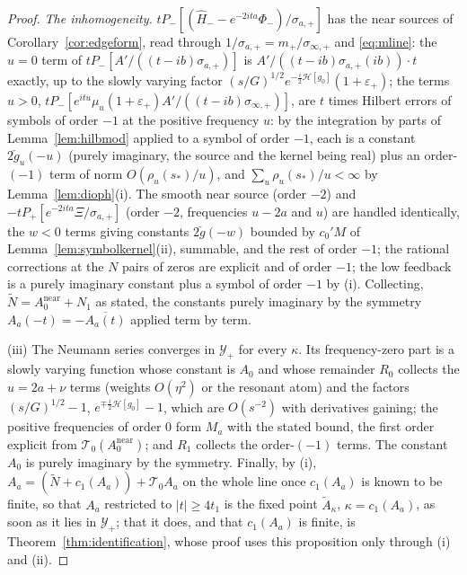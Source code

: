 \documentclass[11pt]{article}
\theoremstyle{definition}
\theoremstyle{remark}
\begin{document}
\begin{proof}
\emph{The inhomogeneity.} $tP_-[(\hat H_--e^{-2ita}\Phi_-)/\sigma_{a,+}]$ has the near sources of Corollary~\ref{cor:edgeform}, read through $1/\sigma_{a,+}=m_+/\sigma_{\infty,+}$ and \eqref{eq:mline}: the $u=0$ term of $tP_-[A'/((t-ib)\sigma_{a,+})]$ is $A'/((t-ib)\sigma_{a,+}(ib))\cdot t$ exactly, up to the slowly varying factor $(s/G)^{1/2}e^{-\frac i2\mathcal H[g_0]}(1+\varepsilon_+)$; the terms $u>0$, $tP_-[e^{itu}\mu_u(1+\varepsilon_+)A'/((t-ib)\sigma_{\infty,+})]$, are $t$ times Hilbert errors of symbols of order $-1$ at the positive frequency $u$: by the integration by parts of Lemma~\ref{lem:hilbmod} applied to a symbol of order $-1$, each is a constant $2\check g_u(-u)$ (purely imaginary, the source and the kernel being real) plus an order-$(-1)$ term of norm $O(\rho_u(s_*)/u)$, and $\sum_u\rho_u(s_*)/u<\infty$ by Lemma~\ref{lem:dioph}(i). The smooth near source (order $-2$) and $-tP_+[e^{-2ita}\Xi/\sigma_{a,+}]$ (order $-2$, frequencies $u-2a$ and $u$) are handled identically, the $w<0$ terms giving constants $2\check g(-w)$ bounded by $c_0'M$ of Lemma~\ref{lem:symbolkernel}(ii), summable, and the rest of order $-1$; the rational corrections at the $N$ pairs of zeros are explicit and of order $-1$; the low feedback is a purely imaginary constant plus a symbol of order $-1$ by (i). Collecting, $\tilde N=A_0^{\mathrm{near}}+N_1$ as stated, the constants purely imaginary by the symmetry $A_a(-t)=-\overline{A_a(t)}$ applied term by term.

(iii) The Neumann series converges in $\mathcal Y_+$ for every $\kappa$. Its frequency-zero part is a slowly varying function whose constant is $A_0$ and whose remainder $R_0$ collects the $u=2a+\nu$ terms (weights $O(\eta^2)$ or the resonant atom) and the factors $(s/G)^{1/2}-1$, $e^{\mp\frac i2\mathcal H[g_0]}-1$, which are $O(s^{-2})$ with derivatives gaining; the positive frequencies of order $0$ form $M_a$ with the stated bound, the first order explicit from $\mathcal T_0(A_0^{\mathrm{near}})$; and $R_1$ collects the order-$(-1)$ terms. The constant $A_0$ is purely imaginary by the symmetry. Finally, by (i), $A_a=(\tilde N+c_1(A_a))+\mathcal T_0A_a$ on the whole line once $c_1(A_a)$ is known to be finite, so that $A_a$ restricted to $|t|\ge4t_1$ is the fixed point $\tilde A_\kappa$, $\kappa=c_1(A_a)$, as soon as it lies in $\mathcal Y_+$; that it does, and that $c_1(A_a)$ is finite, is Theorem~\ref{thm:identification}, whose proof uses this proposition only through (i) and (ii).
\end{proof}
\end{document}
